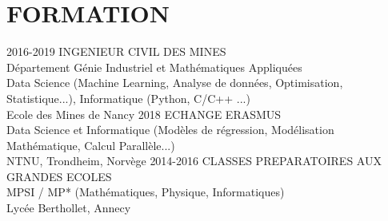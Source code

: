 \documentclass[]{cv-style}
\begin{document}
\section{FORMATION}
\begin{entrylist}
\entry
{2016-2019}
{INGENIEUR CIVIL DES MINES\\
{\normalfont 
    Département Génie Industriel et Mathématiques Appliquées \\
    Data Science (Machine Learning, Analyse de données, Optimisation, 
    Statistique...), 
    Informatique (Python, C/C++ ...) \\
}}
{\vspace{-0.4cm}}
{ \small Ecole des Mines de Nancy}
\entry
{2018}
{ECHANGE ERASMUS \\
{\normalfont 
    Data Science et Informatique (Modèles de régression, Modélisation 
    Mathématique, Calcul Parallèle...) \\
}}
{\vspace{-0.4cm}}
{ \small NTNU, Trondheim, Norvège}
\entry
{2014-2016}
{CLASSES PREPARATOIRES AUX GRANDES ECOLES \\
{\normalfont 
    MPSI / MP* (Mathématiques, Physique, Informatiques)\\
}}
{\vspace{-0.4cm}}
{ \small Lycée Berthollet, Annecy}
%
\end{entrylist}
\end{document}
